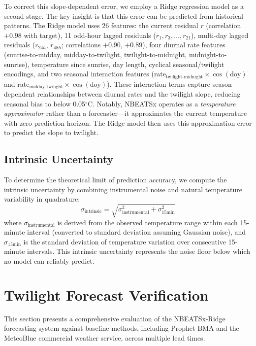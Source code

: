 \documentclass[twocolumn]{aastex631}
\begin{document}
To correct this slope-dependent error, we employ a Ridge regression model as a second stage. The key insight is that this error can be predicted from historical patterns. The Ridge model uses 26 features: the current residual $r$ (correlation $+0.98$ with target), 11 odd-hour lagged residuals ($r_1, r_3, \ldots, r_{21}$), multi-day lagged residuals ($r_{24h}$, $r_{48h}$; correlations $+0.90$, $+0.89$), four diurnal rate features (sunrise-to-midday, midday-to-twilight, twilight-to-midnight, midnight-to-sunrise), temperature since sunrise, day length, cyclical seasonal/twilight encodings, and two seasonal interaction features (rate$_{\text{twilight-midnight}} \times \cos(\text{doy})$ and rate$_{\text{midday-twilight}} \times \cos(\text{doy})$). These interaction terms capture season-dependent relationships between diurnal rates and the twilight slope, reducing seasonal bias to below 0.05$^\circ$C. Notably, NBEATSx operates as a \emph{temperature approximator} rather than a forecaster---it approximates the current temperature with zero prediction horizon. The Ridge model then uses this approximation error to predict the slope to twilight.

\subsection{Intrinsic Uncertainty}
To determine the theoretical limit of prediction accuracy, we compute the intrinsic uncertainty by combining instrumental noise and natural temperature variability in quadrature:
\begin{equation}
\sigma_{\text{intrinsic}} = \sqrt{\sigma_{\text{instrumental}}^2 + \sigma_{\text{15min}}^2}
\end{equation}
where $\sigma_{\text{instrumental}}$ is derived from the observed temperature range within each 15-minute interval (converted to standard deviation assuming Gaussian noise), and $\sigma_{\text{15min}}$ is the standard deviation of temperature variation over consecutive 15-minute intervals. This intrinsic uncertainty represents the noise floor below which no model can reliably predict.

\section{Twilight Forecast Verification}
\label{sec:verification}

This section presents a comprehensive evaluation of the NBEATSx-Ridge forecasting system against baseline methods, including Prophet-BMA and the MeteoBlue commercial weather service, across multiple lead times.
\end{document}
